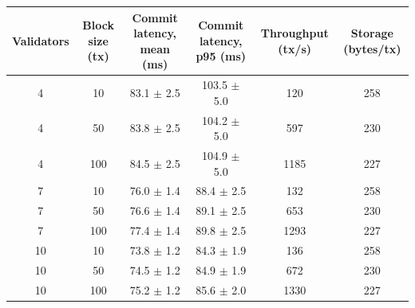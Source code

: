 \begin{tabular}{@{}cccccc@{}}
\toprule
Validators & Block size (tx) & Commit latency, mean (ms) & Commit latency, p95 (ms) & Throughput (tx/s) & Storage (bytes/tx) \\
\midrule
4 & 10 & 83.1 $\pm$ 2.5 & 103.5 $\pm$ 5.0 & 120 & 258 \\
4 & 50 & 83.8 $\pm$ 2.5 & 104.2 $\pm$ 5.0 & 597 & 230 \\
4 & 100 & 84.5 $\pm$ 2.5 & 104.9 $\pm$ 5.0 & 1185 & 227 \\
7 & 10 & 76.0 $\pm$ 1.4 & 88.4 $\pm$ 2.5 & 132 & 258 \\
7 & 50 & 76.6 $\pm$ 1.4 & 89.1 $\pm$ 2.5 & 653 & 230 \\
7 & 100 & 77.4 $\pm$ 1.4 & 89.8 $\pm$ 2.5 & 1293 & 227 \\
10 & 10 & 73.8 $\pm$ 1.2 & 84.3 $\pm$ 1.9 & 136 & 258 \\
10 & 50 & 74.5 $\pm$ 1.2 & 84.9 $\pm$ 1.9 & 672 & 230 \\
10 & 100 & 75.2 $\pm$ 1.2 & 85.6 $\pm$ 2.0 & 1330 & 227 \\
\bottomrule
\end{tabular}
